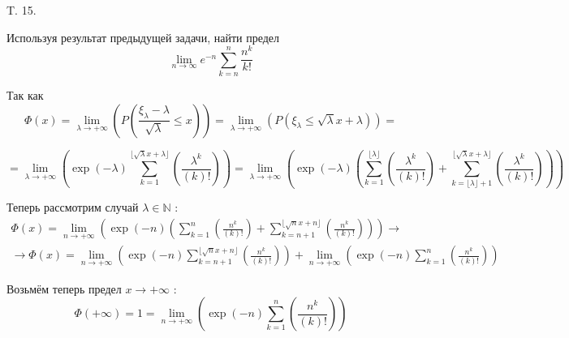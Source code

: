 \documentclass[a4paper,12pt]{article} %
\begin{document}
\begin{example} T. 15. 

Используя результат предыдущей задачи, найти предел
$$
\lim _{n \rightarrow \infty} e^{-n} \sum_{k=n}^{n} \frac{n^{k}}{k !}
$$



Так как
$$
\Phi(x)=\lim _{\lambda \rightarrow+\infty}\left(P\left(\frac{\xi_{\lambda}-\lambda}{\sqrt{\lambda}} \leq x\right)\right)=\lim _{\lambda \rightarrow+\infty}\left(P\left(\xi_{\lambda} \leq \sqrt{\lambda} x+\lambda\right)\right)=
$$



\[ =\lim _{\lambda \rightarrow+\infty}\left(\exp (-\lambda) \sum_{k=1}^{\lfloor\sqrt{\lambda} x+\lambda\rfloor}\left(\frac{\lambda^{k}}{(k) !}\right)\right)=\lim _{\lambda \rightarrow+\infty}\left(\exp (-\lambda)\left(\sum_{k=1}^{\lfloor\lambda\rfloor}\left(\frac{\lambda^{k}}{(k) !}\right)+\sum_{k=\lfloor\lambda\rfloor+1}^{\lfloor\sqrt{\lambda} x+\lambda\rfloor}\left(\frac{\lambda^{k}}{(k) !}\right)\right)\right) \]



Теперь рассмотрим случай $\lambda \in \mathbb{N}$ :
$$
\begin{array}{l}
\Phi(x)=\lim _{n \rightarrow+\infty}\left(\exp (-n)\left(\sum_{k=1}^{n}\left(\frac{n^{k}}{(k) !}\right)+\sum_{k=n+1}^{\lfloor\sqrt{n} x+n\rfloor}\left(\frac{n^{k}}{(k) !}\right)\right)\right) \rightarrow \\
\rightarrow \Phi(x)=\lim _{n \rightarrow+\infty}\left(\exp (-n) \sum_{k=n+1}^{\lfloor\sqrt{n} x+n\rfloor}\left(\frac{n^{k}}{(k) !}\right)\right)+\lim _{n \rightarrow+\infty}\left(\exp (-n) \sum_{k=1}^{n}\left(\frac{n^{k}}{(k) !}\right)\right)
\end{array}
$$



Возьмём теперь предел $x \rightarrow+\infty$ :
$$
\Phi(+\infty)=1=\lim _{n \rightarrow+\infty}\left(\exp (-n) \sum_{k=1}^{n}\left(\frac{n^{k}}{(k) !}\right)\right)
$$









\end{example}
\end{document}
